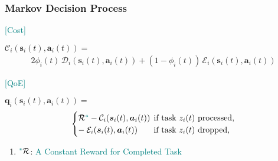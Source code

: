 \begin{frame}
	\frametitle{Markov Decision Process}
	

		\textcolor{teal}{[Cost]} 	\vspace{3mm}
		
		$\mathcal{C}_i(\boldsymbol{s}_i(t),\boldsymbol{a}_i(t)) = $
	\begin{alignat}{2}
		\phi_i(t) \, \mathcal{D}_i(\boldsymbol{s}_i(t),\boldsymbol{a}_i(t)) +(1-\phi_i(t)) \, \mathcal{E}_i(\boldsymbol{s}_i(t),\boldsymbol{a}_i(t))
		\label{23}  
	\end{alignat}

		\vfill

		\textcolor{teal}{[QoE]}   \vspace{3mm}
	

	$	\boldsymbol{q}_i(\boldsymbol{s}_i(t),\boldsymbol{a}_i(t)) =$
\begin{alignat}{2}
	\begin{cases} 
		\mathcal{R}\textcolor{teal}{^*} - \mathcal{C}_i(\boldsymbol{s}_i(t),\boldsymbol{a}_i(t)) & \hspace*{-2mm} \text{if task $z_i(t)$ processed,} \\
		- \hspace*{0.8mm} \mathcal{E}_i(\boldsymbol{s}_i(t),\boldsymbol{a}_i(t)) &	\hspace*{-2mm} \text{if task $z_i(t)$ dropped,}
	\end{cases}
	\label{26}  
\end{alignat}



\begin{enumerate}[]
	
	\item  \hspace{0mm}  $\textcolor{teal}{^*}\mathcal{R}$: \textcolor{teal}{A Constant Reward for Completed Task}
	
	
\end{enumerate}

\end{frame}